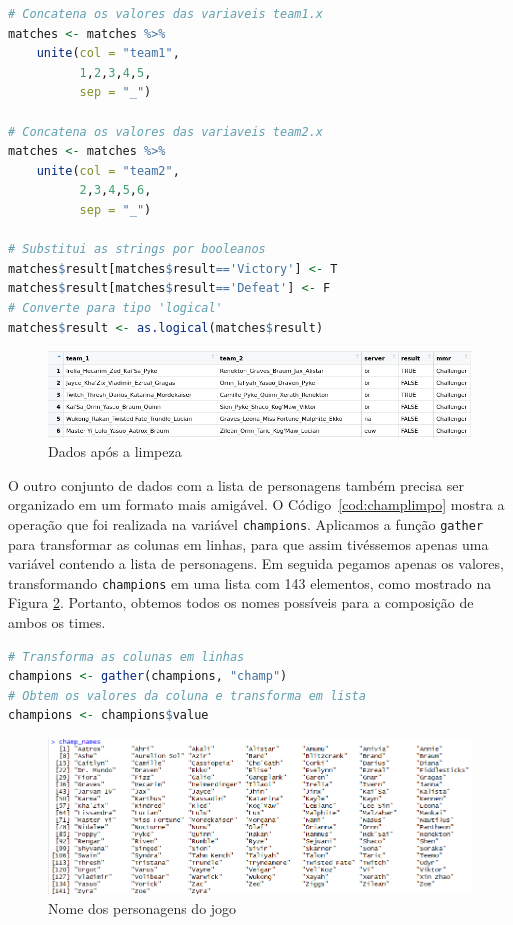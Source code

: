 \documentclass[a4paper]{article}
\begin{document}
\begin{lstlisting}[language=R, caption={Leitura da base de dados},label={cod:readdata}]
# Concatena os valores das variaveis team1.x
matches <- matches %>%
    unite(col = "team1",
          1,2,3,4,5,
          sep = "_")
        
# Concatena os valores das variaveis team2.x
matches <- matches %>%
    unite(col = "team2",
          2,3,4,5,6,
          sep = "_")
          
# Substitui as strings por booleanos        
matches$result[matches$result=='Victory'] <- T
matches$result[matches$result=='Defeat'] <- F
# Converte para tipo 'logical'
matches$result <- as.logical(matches$result)
\end{lstlisting}


\begin{figure}[ht]
\centering
\includegraphics[width=15cm]{imagens/clean_data2}
\caption{\label{fig:data_clean}Dados após a limpeza}
\end{figure}

O outro conjunto de dados com a lista de personagens também precisa ser organizado em um formato mais amigável. O Código~\ref{cod:champlimpo} mostra a operação que foi realizada na variável \texttt{champions}. Aplicamos a função \texttt{gather} para transformar as colunas em linhas, para que assim tivéssemos apenas uma variável contendo a lista de personagens. Em seguida pegamos apenas os valores, transformando \texttt{champions} em uma lista com 143 elementos, como mostrado na Figura \ref{fig:names}. Portanto, obtemos todos os nomes possíveis para a composição de ambos os times. 

\begin{lstlisting}[language=R, caption={Organizando dados com os nomes dos personagens},label={cod:champlimpo}]
# Transforma as colunas em linhas
champions <- gather(champions, "champ")
# Obtem os valores da coluna e transforma em lista
champions <- champions$value
\end{lstlisting}


\begin{figure}
\centering
\includegraphics[width=15cm]{imagens/champ_names}
\caption{\label{fig:names}Nome dos personagens do jogo}
\end{figure}
\end{document}
